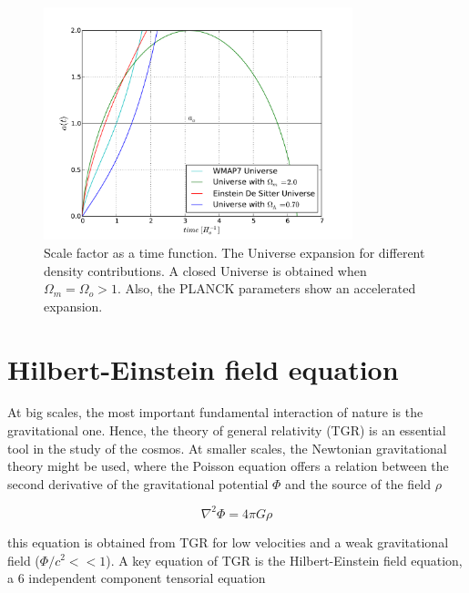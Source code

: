 \begin{figure}[htbp]
       \centering
               \includegraphics[width=0.8\textwidth]{Images/chapter2/factordeescala.pdf}
       \caption{ \small Scale factor as a time function. The Universe expansion for 
       different density contributions. A closed Universe is obtained when 
       $\Omega_m = \Omega_o>1$. Also, the PLANCK parameters show an accelerated expansion. 
        }
       \label{factor}
 \end{figure}

\section{Hilbert-Einstein field equation}

At big scales, the most important fundamental interaction of nature is the 
gravitational one. Hence, the theory of general relativity (TGR) is 
an essential tool in the study of the cosmos. 
At smaller scales, the Newtonian gravitational theory might be used, where
the Poisson equation offers a relation between the second derivative of the
gravitational potential $\Phi$ and the source of the field $\rho$

\[ \nabla^2\Phi=4\pi G\rho\]

this equation is obtained from TGR for low velocities and 
a weak gravitational field ($\Phi/c^2<< 1$). A key equation of TGR is
the Hilbert-Einstein field equation, a 6 independent component tensorial 
equation

